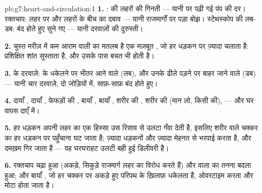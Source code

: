 \begin{solution}{pb:g7:heart-and-circulation:1}
\textbf{1.} :  की लहरों की गिनती --- यानी  पर पढ़ी गई
पंप की दर। रक्तचाप: लहर पर और लहरों के बीच  का दबाव --- यानी
राजमार्गों पर पड़ा बोझ। स्टेथस्कोप की लब-डब:  बंद होते हुए सुने गए
--- यानी दरवाज़ों की दुरुस्ती।

\textbf{2.} चुस्त मरीज़ में कम आराम वाली  का मतलब है एक मज़बूत
, जो हर धड़कन पर ज़्यादा  चलाता है: प्रशिक्षित  शांत सुस्ताता
है, और उसके पास बचत भी होती है।

\textbf{3.}  के दरवाज़े:  के धकेलने पर भीतर आने वाले 
(लब), और उनके ढीले पड़ने पर बाहर जाने वाले  (डब) --- यानी चार
दरवाज़े, दो जोड़ियों में, साफ़-साफ़ बंद होते हुए।

\textbf{4.} दायाँ , दायाँ , फेफड़ों की , बायाँ ,
बायाँ , शरीर की , शरीर की  (मान लो, किसी  की),
 --- और घर वापस दाएँ  में।

\textbf{5.} हर धड़कन अपनी लहर का एक हिस्सा उस रिसाव से उलटा गँवा देती
है, इसलिए शरीर वाले चक्कर का हर धड़कन पर पहुँचाना घट जाता है; 
ज़्यादा धड़कनों और ज़्यादा मेहनत से भरपाई करता है, और दमख़म गिर जाता है
--- वह घरघराहट उलटी बही हुई डिलीवरी है।

\textbf{6.} रक्तचाप चढ़ा हुआ (अकड़े, सिकुड़े राजमार्ग लहर का विरोध करते
हैं) और  वाला  का तनना बदला हुआ; और बायाँ , जो हर चक्कर पर
अकड़े हुए परिपथ के ख़िलाफ़ धकेलता है, ओवरटाइम करता और मोटा होता जाता
है।


\end{solution}
